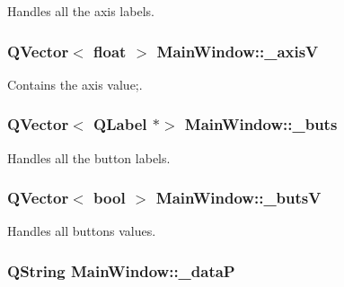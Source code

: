 Handles all the axis labels. 

\hypertarget{a00005_a20f66f574ed4c96d8dfc0013e1095f15}{}
\subsubsection[{\+\_\+axis\+V}]{\setlength{\rightskip}{0pt plus 5cm}Q\+Vector$<$ float $>$ Main\+Window\+::\+\_\+axis\+V\hspace{0.3cm}{\ttfamily [private]}}\label{a00005_a20f66f574ed4c96d8dfc0013e1095f15}


Contains the axis value;. 

\hypertarget{a00005_a8eaf474e1b8672f32873ed009e28ce8a}{}
\subsubsection[{\+\_\+buts}]{\setlength{\rightskip}{0pt plus 5cm}Q\+Vector$<$ Q\+Label $\ast$$>$ Main\+Window\+::\+\_\+buts\hspace{0.3cm}{\ttfamily [private]}}\label{a00005_a8eaf474e1b8672f32873ed009e28ce8a}


Handles all the button labels. 

\hypertarget{a00005_a519ae4630572cb63fbd04bce12fe8e77}{}
\subsubsection[{\+\_\+buts\+V}]{\setlength{\rightskip}{0pt plus 5cm}Q\+Vector$<$ bool $>$ Main\+Window\+::\+\_\+buts\+V\hspace{0.3cm}{\ttfamily [private]}}\label{a00005_a519ae4630572cb63fbd04bce12fe8e77}


Handles all buttons values. 

\hypertarget{a00005_aaccbe653019df03668429890e325ac21}{}
\subsubsection[{\+\_\+data\+P}]{\setlength{\rightskip}{0pt plus 5cm}Q\+String Main\+Window\+::\+\_\+data\+P\hspace{0.3cm}{\ttfamily [private]}}\label{a00005_aaccbe653019df03668429890e325ac21}


